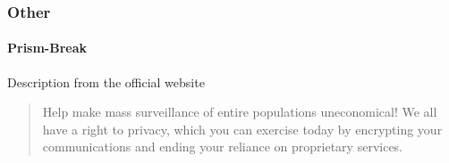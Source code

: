







\subsubsection{Other}
\paragraph{Prism-Break}
Description from the official website \cite{Prism-Break}
\blockquote{Help make mass surveillance of entire populations uneconomical! We all have a right to privacy, which you can exercise today by encrypting your communications and ending your reliance on proprietary services.}


